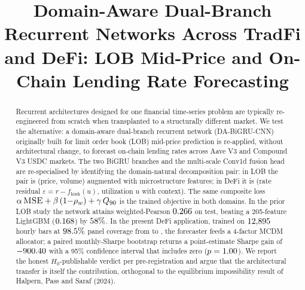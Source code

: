\documentclass[conference]{IEEEtran}
\title{Domain-Aware Dual-Branch Recurrent Networks Across TradFi and DeFi:
       LOB Mid-Price and On-Chain Lending Rate Forecasting}
\author{
  \IEEEauthorblockN{Sergei~S.~Solovev}
  \IEEEauthorblockA{Faculty of Computer Science\\
  HSE University, Moscow, Russia\\
  \texttt{sesesolovev@edu.hse.ru}}
}
\begin{document}
\maketitle

\begin{abstract}
Recurrent architectures designed for one financial time-series problem are
typically re-engineered from scratch when transplanted to a structurally
different market. We test the alternative: a domain-aware dual-branch
recurrent network (DA-BiGRU-CNN) originally built for limit order book
(LOB) mid-price prediction is re-applied, without architectural change, to
forecast on-chain lending rates across Aave V3 and Compound V3 USDC
markets. The two BiGRU branches and the multi-scale Conv1d fusion head are
re-specialised by identifying the domain-natural decomposition pair: in
LOB the pair is (price, volume) augmented with microstructure features; in
DeFi it is (rate residual $\varepsilon = r - f_{\text{kink}}(u)$,
utilization $u$ with context). The same composite loss
$\alpha\,\textsc{MSE} + \beta\,(1{-}\rho_w) + \gamma\,Q_{90}$ is the
trained objective in both domains. In the prior LOB study the network
attains weighted-Pearson $0.266{}$ on test, beating a 205-feature
LightGBM ($0.168{}$) by $58\%{}$. In the present
DeFi application, trained on $12{,}895{}$ hourly bars at $98.5\%$
panel coverage from \DataStart{} to \DataEnd{}, the forecaster feeds a
4-factor MCDM allocator; a paired monthly-Sharpe bootstrap returns a
point-estimate Sharpe gain of $-900.40{}$ with a 95\% confidence
interval that includes zero ($p = 1.00{}$). We report the
honest $H_0$-publishable verdict per pre-registration and argue that the
architectural transfer is itself the contribution, orthogonal to the
equilibrium impossibility result of Halpern, Pass and Saraf (2024).
\end{abstract}












\end{document}
